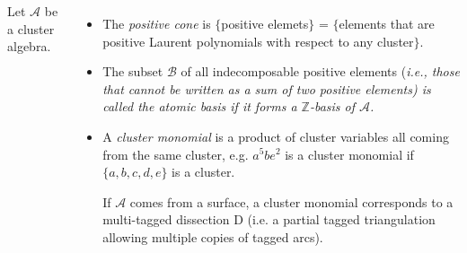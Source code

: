 \documentclass[a0paper, portrait, 17pt]{tikzposter}
\begin{document}
\begin{columns}

{Let $\mathcal{A}$ be a cluster algebra.
\begin{itemize}
 \item The \emph{positive cone} is
 $\{$positive elemets$\}$ = 
  $\{$elements that are positive Laurent polynomials %
 with respect to any cluster$\}$.
  
\item The subset $\mathcal{B}$ of all indecomposable positive elements (\it{i.e.}, those that cannot be written as a sum of two positive elements)
is called the \emph{atomic basis} if it forms a $\mathbb{Z}$-basis of $\mathcal{A}$.

 
 \item A \emph{cluster monomial} is a product of cluster variables all coming from the same cluster,
e.g. $a^{5}be^2$ is a cluster monomial if $\{a,b,c,d,e \}$ is a cluster.

If $\mathcal{A}$ comes from a surface, a cluster monomial corresponds to a multi-tagged dissection D (i.e. a partial tagged triangulation allowing multiple copies of tagged arcs).
 \end{itemize}
 }


\end{columns}
\end{document}
